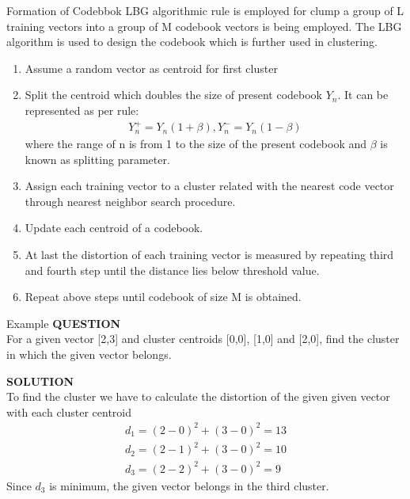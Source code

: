 \documentclass{beamer}
\begin{document}
\begin{frame}{Formation of Codebbok}
LBG algorithmic rule is employed for clump a group of L training vectors into a group of M codebook vectors is being employed. The LBG algorithm is used to design the codebook which is further used in clustering.
\begin{enumerate}
\item
Assume a random vector as centroid for first cluster
\item 
Split the centroid which doubles the size of
present codebook $Y_{n}$. It can be represented as per
rule:
\begin{align}
    Y_{n}^{+}=Y_{n}(1+\beta), Y_{n}^{-}=Y_{n}(1-\beta)
\end{align}
where the range of n is from 1 to the size of the
present codebook and $\beta$ is known as splitting
parameter.

\item  Assign each training vector to a cluster related with
the nearest code vector through nearest neighbor search
procedure.
\item  Update each centroid of a codebook.
\item  At last the distortion of each training vector is measured by repeating third and fourth
step until the distance lies below threshold value.
\item  Repeat above steps until codebook of size M is obtained.
\end{enumerate}
\end{frame}
\begin{frame}{Example}
 \textbf{QUESTION}\\
 For a given vector [2,3] and cluster centroids [0,0], [1,0] and [2,0], find the cluster in which the given vector belongs.
 \begin{block}{}
  \textbf{SOLUTION}\\
  To find the cluster we have to calculate the distortion of the given given vector with each cluster centroid\\
 \begin{align}
      d_{1}= (2-0)^{2} + (3-0)^{2}=13\\
      d_2= (2-1)^{2} + (3-0)^{2}=10\\
      d_{3}= (2-2)^{2} + (3-0)^{2}=9
 \end{align}
  Since $d_{3}$ is minimum, the given vector belongs in the third cluster.
  
 \end{block}
 \end{frame}
\end{document}
